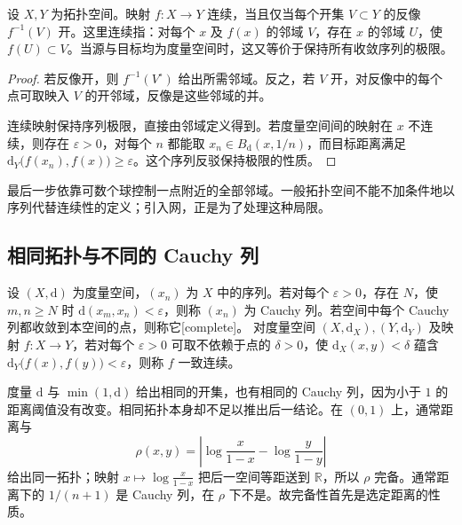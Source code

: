 \begin{proposition}\label{b1:prop:app-continuity}
设 \(X,Y\) 为拓扑空间。映射 \(f:X\rightarrow Y\) 连续，当且仅当每个开集 \(V\subset Y\) 的反像 \(f^{-1}(V)\) 开。这里连续指：对每个 \(x\) 及 \(f(x)\) 的邻域 \(V\)，存在 \(x\) 的邻域 \(U\)，使 \(f(U)\subset V\)。当源与目标均为度量空间时，这又等价于保持所有收敛序列的极限。
\end{proposition}
\begin{proof}
若反像开，则 \(f^{-1}(V^\circ)\) 给出所需邻域。反之，若 \(V\) 开，对反像中的每个点可取映入 \(V\) 的开邻域，反像是这些邻域的并。

连续映射保持序列极限，直接由邻域定义得到。若度量空间间的映射在 \(x\) 不连续，则存在 \(\varepsilon>0\)，对每个 \(n\) 都能取 \(x_n\in B_{\mathrm{d}}(x,1/n)\)，而目标距离满足 \(\mathrm{d}_Y\bigl(f(x_n),f(x)\bigr)\ge\varepsilon\)。这个序列反驳保持极限的性质。
\end{proof}

最后一步依靠可数个球控制一点附近的全部邻域。一般拓扑空间不能不加条件地以序列代替连续性的定义；引入网，正是为了处理这种局限。

\subsection{相同拓扑与不同的 Cauchy 列}
\label{b1:subsec:A10102}

\begin{definition}\label{b1:def:app-complete}
设 \((X,\mathrm d)\) 为度量空间，\((x_n)\) 为 \(X\) 中的序列。若对每个 \(\varepsilon>0\)，存在 \(N\)，使 \(m,n\ge N\) 时 \(\mathrm{d}(x_m,x_n)<\varepsilon\)，则称 \((x_n)\) 为 Cauchy 列。若空间中每个 Cauchy 列都收敛到本空间的点，则称它[complete]。
对度量空间 \((X,\mathrm d_X),(Y,\mathrm d_Y)\) 及映射 \(f:X\to Y\)，若对每个 \(\varepsilon>0\) 可取不依赖于点的 \(\delta>0\)，使 \(\mathrm{d}_X(x,y)<\delta\) 蕴含 \(\mathrm{d}_Y\bigl(f(x),f(y)\bigr)<\varepsilon\)，则称 \(f\) 一致连续。
\end{definition}

度量 \(\mathrm{d}\) 与 \(\min(1,\mathrm{d})\) 给出相同的开集，也有相同的 Cauchy 列，因为小于 \(1\) 的距离阈值没有改变。相同拓扑本身却不足以推出后一结论。在 \((0,1)\) 上，通常距离与
\[
 \rho(x,y)=\left|\log\frac{x}{1-x}-\log\frac{y}{1-y}\right|
\]
给出同一拓扑；映射 \(x\mapsto\log\frac{x}{1-x}\) 把后一空间等距送到 \(\mathbb R\)，所以 \(\rho\) 完备。通常距离下的 \(1/(n+1)\) 是 Cauchy 列，在 \(\rho\) 下不是。故完备性首先是选定距离的性质。

